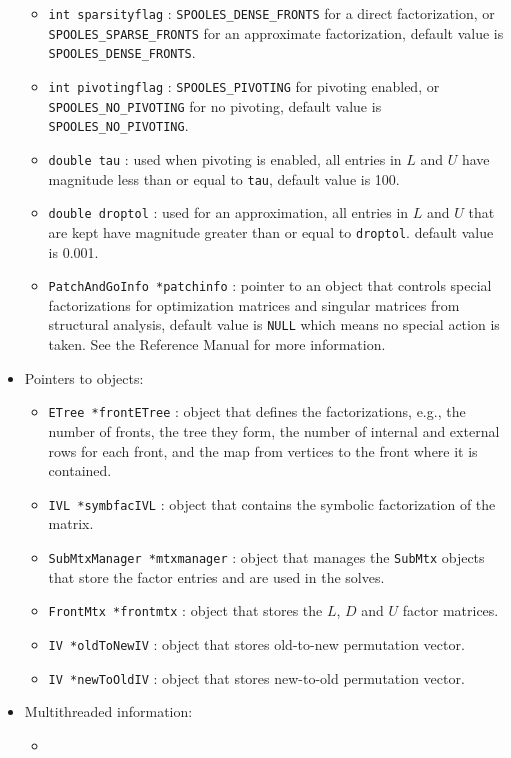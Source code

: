 \begin{itemize}
\begin{itemize}
\item
{\tt int sparsityflag} : 
{\tt SPOOLES\_DENSE\_FRONTS} for a direct factorization,
or {\tt SPOOLES\_SPARSE\_FRONTS} for an approximate factorization,
default value is {\tt SPOOLES\_DENSE\_FRONTS}.
\item
{\tt int pivotingflag} : 
{\tt SPOOLES\_PIVOTING} for pivoting enabled,
or {\tt SPOOLES\_NO\_PIVOTING} for no pivoting,
default value is {\tt SPOOLES\_NO\_PIVOTING}.
\item
{\tt double tau} : used when pivoting is enabled,
all entries in $L$ and $U$ have magnitude less than or equal to
\texttt{tau},
default value is 100.
\item
{\tt double droptol} : used for an approximation,
all entries in $L$ and $U$ that are kept 
have magnitude greater than or equal to \texttt{droptol}.
default value is 0.001.
\item
{\tt PatchAndGoInfo *patchinfo} : pointer to an object that
controls special factorizations for optimization matrices
and singular matrices from structural analysis,
default value is \texttt{NULL} which means no special action is taken.
See the Reference Manual for more information.
\end{itemize}
%
\item Pointers to objects:
\begin{itemize}
\item
{\tt ETree *frontETree} : object that defines the factorizations,
e.g., the number of fronts, the tree they form, the number of
internal and external rows for each front, and the map from
vertices to the front where it is contained.
\item
{\tt IVL *symbfacIVL} : object that contains the symbolic
factorization of the matrix.
\item
{\tt SubMtxManager *mtxmanager} : object that manages the
\texttt{SubMtx} objects that store the factor entries and are used
in the solves.
\item
{\tt FrontMtx *frontmtx} : object that stores the $L$, $D$ and $U$
factor matrices.
\item
{\tt IV *oldToNewIV} : object that stores old-to-new permutation vector.
\item
{\tt IV *newToOldIV} : object that stores new-to-old permutation vector.
\end{itemize}
%
\item Multithreaded information:
\begin{itemize}
\item

\end{itemize}
\end{itemize}
